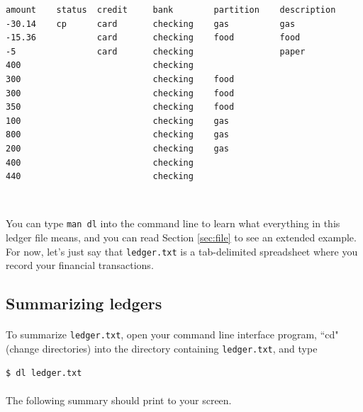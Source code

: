 \documentclass{article}
\providecommand{\q}{$\quad$ \newline}
\begin{document}
\begin{flushleft}
\begin{lstlisting}[title=ledger.txt]
amount    status  credit     bank        partition    description
-30.14    cp      card       checking    gas          gas
-15.36            card       checking    food         food
-5                card       checking                 paper
400                          checking
300                          checking    food
300                          checking    food
350                          checking    food
100                          checking    gas
800                          checking    gas
200                          checking    gas
400                          checking
440                          checking
\end{lstlisting} \q
 
You can type {\tt man dl} into the command line to learn what everything in this ledger file means, and you can read Section \ref{sec:file} to see an extended example. For now, let's just say that {\tt ledger.txt} is a tab-delimited spreadsheet where you record your financial transactions.

\subsection{Summarizing ledgers}

\paragraph{} To summarize {\tt ledger.txt}, open your command line interface program, ``cd" (change directories) into the directory containing {\tt ledger.txt}, and type

\begin{lstlisting}
$ dl ledger.txt
\end{lstlisting} 

\paragraph{} The following summary should print to your screen.


\end{flushleft}
\end{document}
